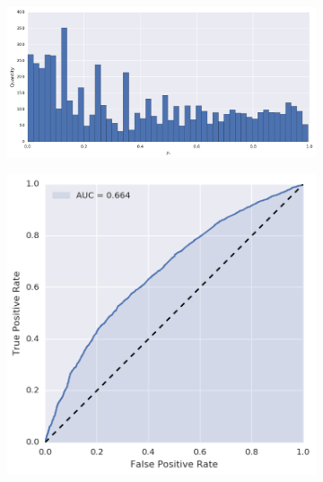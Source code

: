 \begin{figure}[p]
\centering
\begin{subfigure}[t]{\textwidth}
	\centering
	\includegraphics[height=.20\textheight]{figures/bayes/least1/hist_calls.png}
\end{subfigure}
\begin{subfigure}[b]{.49\textwidth}
	\raggedleft{}
	\includegraphics[height=.20\textheight]{figures/bayes/least1/roc_calls.png}
\end{subfigure}
\begin{subfigure}[b]{.49\textwidth}
	\raggedright{}

\end{subfigure}
\end{figure}

